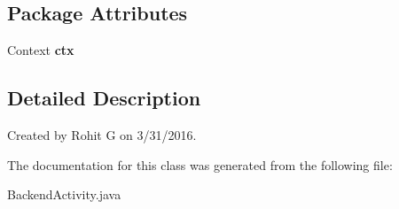 \subsection*{\-Package \-Attributes}
\begin{DoxyCompactItemize}
\item 
\hypertarget{classcom_1_1example_1_1sel_1_1lostfound_1_1BackendActivity_a61bb5064aa308656bd2f4c04ea47526c}{\-Context {\bfseries ctx}}\label{classcom_1_1example_1_1sel_1_1lostfound_1_1BackendActivity_a61bb5064aa308656bd2f4c04ea47526c}

\end{DoxyCompactItemize}


\subsection{\-Detailed \-Description}
\-Created by \-Rohit \-G on 3/31/2016. 

\-The documentation for this class was generated from the following file\-:\begin{DoxyCompactItemize}
\item 
\-Backend\-Activity.\-java\end{DoxyCompactItemize}
